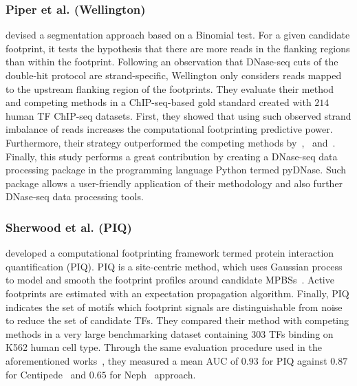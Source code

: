 \subsubsection{Piper et al. (Wellington)}

\cite{piper2013} devised a segmentation approach based on a Binomial test. For a given candidate footprint, it tests the hypothesis that there are more reads in the flanking regions than within the footprint. Following an observation that DNase-seq cuts of the double-hit protocol are strand-specific, Wellington only considers reads mapped to the upstream flanking region of the footprints. They evaluate their method and competing methods in a ChIP-seq-based gold standard created with $214$ human TF ChIP-seq datasets. First, they showed that using such observed strand imbalance of reads increases the computational footprinting predictive power. Furthermore, their strategy outperformed the competing methods by~\cite{hesselberth2009},~\cite{neph2012a} and~\cite{pique2011}. Finally, this study performs a great contribution by creating a DNase-seq data processing package in the programming language Python termed pyDNase. Such package allows a user-friendly application of their methodology and also further DNase-seq data processing tools.

\subsubsection{Sherwood et al. (PIQ)}

\cite{sherwood2014} developed a computational footprinting framework termed protein interaction quantification (PIQ). PIQ is a site-centric method, which uses Gaussian process to model and smooth the footprint profiles around candidate MPBSs~\citep{sherwood2014}. Active footprints are estimated with an expectation propagation algorithm. Finally, PIQ indicates the set of motifs which footprint signals are distinguishable from noise to reduce the set of candidate TFs. They compared their method with competing methods in a very large benchmarking dataset containing $303$ TFs binding on K562 human cell type. Through the same evaluation procedure used in the aforementioned works~\citep{pique2011,cuellar2012,piper2013}, they measured a mean AUC of $0.93$ for PIQ against $0.87$ for Centipede~\citep{pique2011} and $0.65$ for Neph~\citep{neph2012a} approach.

